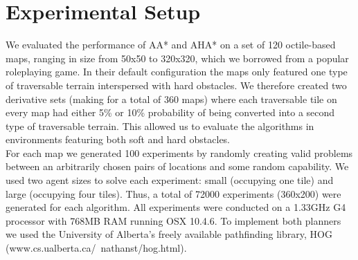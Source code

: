 \section{Experimental Setup}
We evaluated the performance of AA* and AHA* on a set of 120 octile-based maps, ranging in size from 50x50 to 320x320, which we borrowed from a popular roleplaying game.
In their default configuration the maps only featured one type of traversable terrain interspersed with hard obstacles. 
We therefore created two derivative sets (making for a total of 360 maps) where each traversable tile on every map had either 5\% or 10\% probability of being converted into a second type of traversable terrain. 
This allowed us to evaluate the algorithms in environments featuring both soft and hard obstacles.\\
For each map we generated 100 experiments by randomly creating valid problems between an arbitrarily chosen pairs of locations and some random capability.
We used two agent sizes to solve each experiment: small (occupying one tile) and large (occupying four tiles). 
Thus, a total of 72000 experiments (360x200) were generated for each algorithm. 
All experiments were conducted on a 1.33GHz G4 processor with 768MB RAM running OSX 10.4.6.
To implement both planners we used the University of Alberta's freely available pathfinding library, HOG (www.cs.ualberta.ca/~nathanst/hog.html). 
